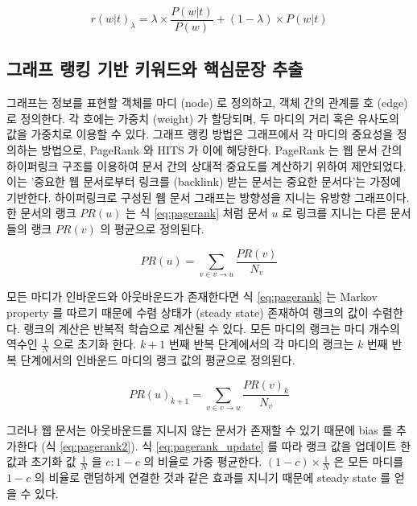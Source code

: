 \documentclass[oneside, ko,phd]{snuthesis_utf8_kor}
\begin{document}
\begin{equation}
  \label{eq:ldavis}
  r(w \vert t)_\lambda = \lambda \times \frac{P(w \vert t)}{P(w)} + (1 - \lambda) \times P(w \vert t)
\end{equation}

\subsection{그래프 랭킹 기반 키워드와 핵심문장 추출}

그래프는 정보를 표현할 객체를 마디 (node) 로 정의하고, 객체 간의 관계를 호 (edge) 로 정의한다.
각 호에는 가중치 (weight) 가 할당되며, 두 마디의 거리 혹은 유사도의 값을 가중치로 이용할 수 있다.
그래프 랭킹 방법은 그래프에서 각 마디의 중요성을 정의하는 방법으로, PageRank \cite{ilprints422}와 HITS \cite{kleinberg1999authoritative} 가 이에 해당한다.
PageRank 는 웹 문서 간의 하이퍼링크 구조를 이용하여 문서 간의 상대적 중요도를 계산하기 위하여 제안되었다.
이는 '중요한 웹 문서로부터 링크를 (backlink) 받는 문서는 중요한 문서다'는 가정에 기반한다.
하이퍼링크로 구성된 웹 문서 그래프는 방향성을 지니는 유방향 그래프이다.
한 문서의 랭크 $PR(u)$ 는 식 \ref{eq:pagerank} 처럼 문서 $u$ 로 링크를 지니는 다른 문서들의 랭크 $PR(v)$ 의 평균으로 정의된다.

\begin{equation}
  \label{eq:pagerank}
  PR(u) = \sum_{v \in v \rightarrow u} \frac{PR(v)}{N_v}
\end{equation}

모든 마디가 인바운드와 아웃바운드가 존재한다면 식 \ref{eq:pagerank} 는 Markov property 를 따르기 때문에 수렴 상태가 (steady state) 존재하여 랭크의 값이 수렴한다.
랭크의 계산은 반복적 학습으로 계산될 수 있다.
모든 마디의 랭크는 마디 개수의 역수인 $\frac{1}{N}$ 으로 초기화 한다.
$k+1$ 번째 반복 단계에서의 각 마디의 랭크는 $k$ 번째 반복 단계에서의 인바운드 마디의 랭크 값의 평균으로 정의된다.

\begin{equation}
  \label{eq:pagerank_update}
  PR(u)_{k+1} = \sum_{v \in v \rightarrow u} \frac{PR(v)_k}{N_v}
\end{equation}

그러나 웹 문서는 아웃바운드를 지니지 않는 문서가 존재할 수 있기 때문에 bias 를 추가한다 (식 \ref{eq:pagerank2}).
식 \ref{eq:pagerank_update} 를 따라 랭크 값을 업데이트 한 값과 초기화 값 $\frac{1}{N}$ 을 $c : 1-c$ 의 비율로 가중 평균한다.
$(1-c) \times \frac{1}{N}$ 은 모든 마디를 $1-c$ 의 비율로 랜덤하게 연결한 것과 같은 효과를 지니기 때문에 steady state 를 얻을 수 있다.
\end{document}
